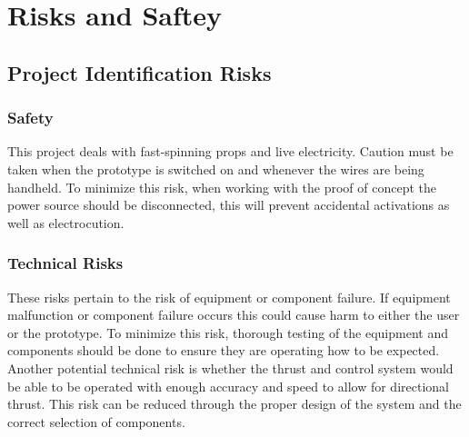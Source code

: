 \chapter{Risks and Saftey}
\label{sec: Risk_and_saftey}
\vspace{-3mm}
\section{Project Identification Risks}
\subsection{Safety}
    This project deals with fast-spinning props and live electricity. Caution must be taken when the prototype is switched on and whenever the wires are being handheld. To minimize this risk, when working with the proof of concept the power source should be disconnected, this will prevent accidental activations as well as electrocution.
    \vspace{-1mm}
    \subsection{Technical Risks}
    These risks pertain to the risk of equipment or component failure. If equipment malfunction or component failure occurs this could cause harm to either the user or the prototype. To minimize this risk, thorough testing of the equipment and components should be done to ensure they are operating how to be expected. Another potential technical risk is whether the thrust and control system would be able to be operated with enough accuracy and speed to allow for directional thrust. This risk can be reduced through the proper design of the system and the correct selection of components. 
    \vspace{-1mm}
